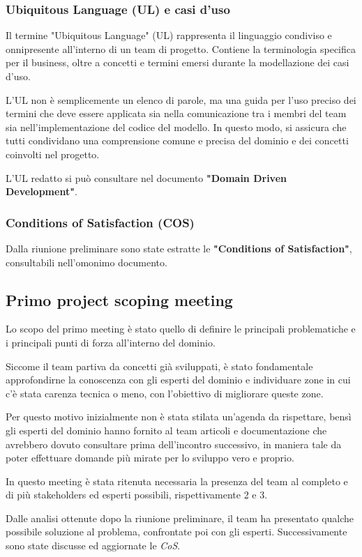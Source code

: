 \subsubsection{Ubiquitous Language (UL) e casi d'uso}
Il termine "Ubiquitous Language" (UL) rappresenta il linguaggio condiviso e onnipresente all'interno di un team
di progetto. Contiene la terminologia specifica per il business, oltre a concetti e termini emersi durante la
modellazione dei casi d'uso.

L'UL non è semplicemente un elenco di parole, ma una guida per l'uso preciso dei
termini che deve essere applicata sia nella comunicazione tra i membri del team sia nell'implementazione del
codice del modello. In questo modo, si assicura che tutti condividano una comprensione comune e precisa del
dominio e dei concetti coinvolti nel progetto.

L'UL redatto si può consultare nel documento \textbf{"Domain Driven Development"}.

\subsubsection{Conditions of Satisfaction (COS)}
Dalla riunione preliminare sono state estratte le \textbf{"Conditions of Satisfaction"}, consultabili nell'omonimo documento.

\subsection{Primo project scoping meeting}
Lo scopo del primo meeting è stato quello di definire le principali problematiche e i principali punti di forza all'interno del dominio.

Siccome il team partiva da concetti già sviluppati, è stato fondamentale approfondirne la conoscenza con gli esperti del dominio e
individuare zone in cui c'è stata carenza tecnica o meno, con l'obiettivo di migliorare queste zone.

Per questo motivo inizialmente non è stata stilata un'agenda da rispettare, bensì gli esperti del dominio hanno fornito al team articoli e documentazione
che avrebbero dovuto consultare prima dell'incontro successivo, in maniera tale da poter effettuare domande più mirate per lo sviluppo vero e proprio.

In questo meeting è stata ritenuta necessaria la presenza del team al completo e di più stakeholders ed esperti possibili, rispettivamente 2 e 3.

Dalle analisi ottenute dopo la riunione preliminare, il team ha presentato qualche possibile soluzione al problema, confrontate poi con gli esperti.
Successivamente sono state discusse ed aggiornate le \textit{CoS}.

